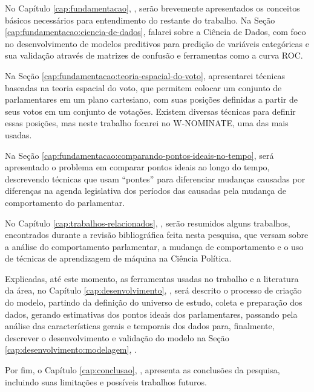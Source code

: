 No Capítulo \ref{cap:fundamentacao}, , serão
brevemente apresentados os conceitos básicos necessários para entendimento do
restante do trabalho. Na Seção \ref{cap:fundamentacao:ciencia-de-dados}, falarei
sobre a Ciência de Dados, com foco no desenvolvimento de modelos preditivos
para predição de variáveis categóricas e sua validação através de matrizes de
confusão e ferramentas como a curva \gls{ROC}.

Na Seção \ref{cap:fundamentacao:teoria-espacial-do-voto}, apresentarei técnicas
baseadas na teoria espacial do voto, que permitem colocar um conjunto de
parlamentares em um plano cartesiano, com suas posições definidas a partir de
seus votos em um conjunto de votações. Existem diversas técnicas para definir
essas posições, mas neste trabalho focarei no W-NOMINATE, uma das mais usadas.

Na Seção \ref{cap:fundamentacao:comparando-pontos-ideais-no-tempo}, será
apresentado o problema em comparar pontos ideais ao longo do tempo, descrevendo
técnicas que usam ``pontes'' para diferenciar mudanças causadas por diferenças
na agenda legislativa dos períodos das causadas pela mudança de comportamento
do parlamentar.

No Capítulo \ref{cap:trabalhos-relacionados},
, serão resumidos alguns trabalhos,
encontrados durante a revisão bibliográfica feita nesta pesquisa, que versam
sobre a análise do comportamento parlamentar, a mudança de comportamento e o
uso de técnicas de aprendizagem de máquina na Ciência Política.

Explicadas, até este momento, as ferramentas usadas no trabalho e a literatura
da área, no Capítulo \ref{cap:desenvolvimento}, ,
será descrito o processo de criação do modelo, partindo da definição do
universo de estudo, coleta e preparação dos dados, gerando estimativas dos
pontos ideais dos parlamentares, passando pela análise das características
gerais e temporais dos dados para, finalmente, descrever o desenvolvimento e
validação do modelo na Seção \ref{cap:desenvolvimento:modelagem},
.

Por fim, o Capítulo \ref{cap:conclusao}, , apresenta as
conclusões da pesquisa, incluindo suas limitações e possíveis trabalhos futuros.

